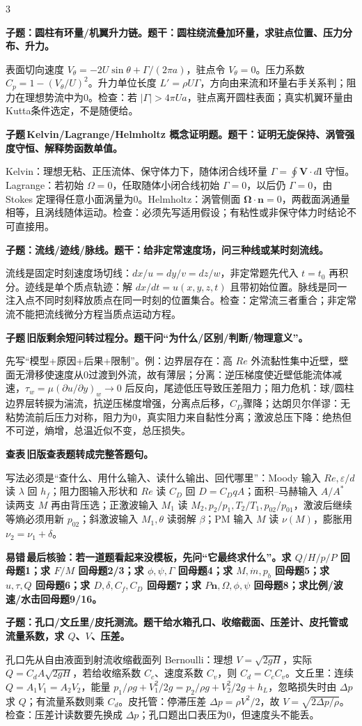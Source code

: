 \documentclass[a4paper]{article}
\newcommand{\qt}[1]{\vspace{0.04pt}\colorbox{Q}{\parbox{\dimexpr\linewidth-2\fboxsep}{\color{white}\bfseries #1}}\par}
\newcommand{\ans}[1]{\colorbox{G}{\parbox{\dimexpr\linewidth-2\fboxsep}{#1}}\par}
\newcommand{\labtag}[3]{{\bfseries\color{#1}\colorbox{#1}{\color{white}\fontsize{2.18}{2.28}\selectfont #2}\,#3}\par}
\newcommand{\subt}[1]{\labtag{Q}{子题}{#1}}
\newcommand{\err}[1]{\labtag{R}{易错}{#1}}
\newcommand{\lookup}[1]{\labtag{C}{查表}{#1}}
\begin{document}
\begin{multicols}{3}
\qt{子题：圆柱有环量/机翼升力链。题干：圆柱绕流叠加环量，求驻点位置、压力分布、升力。}
\ans{表面切向速度 $V_\theta=-2U\sin\theta+\Gamma/(2\pi a)$，驻点令 $V_\theta=0$。压力系数 $C_p=1-(V_\theta/U)^2$。升力单位长度 $L'=\rho U\Gamma$，方向由来流和环量右手关系判；阻力在理想势流中为0。检查：若 $|\Gamma|>4\pi Ua$，驻点离开圆柱表面；真实机翼环量由Kutta条件选定，不是随便给。}
\subt{Kelvin/Lagrange/Helmholtz 概念证明题。题干：证明无旋保持、涡管强度守恒、解释势函数单值。}
\ans{Kelvin：理想无粘、正压流体、保守体力下，随体闭合线环量 $\Gamma=\oint\bm V\cdot d\bm l$ 守恒。Lagrange：若初始 $\Omega=0$，任取随体小闭合线初始 $\Gamma=0$，以后仍 $\Gamma=0$，由 Stokes 定理得任意小面涡量为0。Helmholtz：涡管侧面 $\bm\Omega\cdot\bm n=0$，两截面涡通量相等，且涡线随体运动。检查：必须先写适用假设；有粘性或非保守体力时结论不可直接用。}
\qt{子题：流线/迹线/脉线。题干：给非定常速度场，问三种线或某时刻流线。}
\ans{流线是固定时刻速度场切线：$dx/u=dy/v=dz/w$，非定常题先代入 $t=t_0$ 再积分。迹线是单个质点轨迹：解 $dx/dt=u(x,y,z,t)$ 且带初始位置。脉线是同一注入点不同时刻释放质点在同一时刻的位置集合。检查：定常流三者重合；非定常流不能把流线微分方程当质点运动方程。}
\subt{旧版剩余短问转过程分。题干问“为什么/区别/判断/物理意义”。}
\ans{先写“模型+原因+后果+限制”。例：边界层存在：高 $Re$ 外流黏性集中近壁，壁面无滑移使速度从0过渡到外流，故有薄层；分离：逆压梯度使近壁低能流体减速，$\tau_w=\mu(\partial u/\partial y)_w\to0$ 后反向，尾迹低压导致压差阻力；阻力危机：球/圆柱边界层转捩为湍流，抗逆压梯度增强，分离点后移，$C_D$骤降；达朗贝尔佯谬：无粘势流前后压力对称，阻力为0，真实阻力来自黏性分离；激波总压下降：绝热但不可逆，熵增，总温近似不变，总压损失。}
\lookup{旧版查表题转成完整答题句。}
\ans{写法必须是“查什么、用什么输入、读什么输出、回代哪里”：Moody 输入 $Re,\varepsilon/d$ 读 $\lambda$ 回 $h_f$；阻力图输入形状和 $Re$ 读 $C_D$ 回 $D=C_DqA$；面积--马赫输入 $A/A^*$ 读两支 $M$ 再由背压选；正激波输入 $M_1$ 读 $M_2,p_2/p_1,T_2/T_1,p_{02}/p_{01}$，激波后继续等熵必须用新 $p_{02}$；斜激波输入 $M_1,\theta$ 读弱解 $\beta$；PM 输入 $M$ 读 $\nu(M)$，膨胀用 $\nu_2=\nu_1+\delta$。}
\err{最后核验：若一道题看起来没模板，先问“它最终求什么”。求 $Q/H/p/P$ 回母题1；求 $F/M$ 回母题2/3；求 $\phi,\psi,\Gamma$ 回母题4；求 $M,\dot m,p_b$ 回母题5；求 $u,\tau,Q$ 回母题6；求 $D,\delta,C_f,C_D$ 回母题7；求 $P\bm n,\Omega,\phi,\psi$ 回母题8；求比例/波速/水击回母题9/16。}
\qt{子题：孔口/文丘里/皮托测流。题干给水箱孔口、收缩截面、压差计、皮托管或流量系数，求 $Q$、$V$、压差。}
\ans{孔口先从自由液面到射流收缩截面列 Bernoulli：理想 $V=\sqrt{2gH}$，实际 $Q=C_dA\sqrt{2gH}$，若给收缩系数 $C_c$、速度系数 $C_v$，则 $C_d=C_cC_v$。文丘里：连续 $Q=A_1V_1=A_2V_2$，能量 $p_1/\rho g+V_1^2/2g=p_2/\rho g+V_2^2/2g+h_L$，忽略损失时由 $\Delta p$ 求 $Q$；有流量系数则乘 $C_d$。皮托管：停滞压差 $\Delta p=\rho V^2/2$，故 $V=\sqrt{2\Delta p/\rho}$。检查：压差计读数要先换成 $\Delta p$；孔口题出口表压为0，但速度头不能丢。}

\end{multicols}
\end{document}
